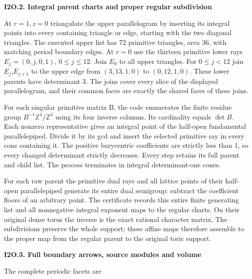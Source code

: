 \par

\medskip\noindent\textbf{I2O.2. Integral parent charts and proper regular subdivision}

\par\nobreak

At \(r=1,z=0\) triangulate the upper parallelogram by inserting its
integral points into every containing triangle or edge, starting
with the two diagonal triangles. The executed upper list has 72
primitive triangles, area 36, with matching period boundary edges.
At \(r=0\) use the thirteen primitive lower rays \(E_j=(0,j,0,1)\),
\(0\le j\le 12\). Join \(E_0\) to all upper triangles. For \(0\le j<12\) join
\(E_j\),\(E_{j+1}\) to the upper edge from \((3,13,1,0)\) to \((0,12,1,0)\).
These lower parents have determinant 3. The joins cover every
slice of the displayed parallelogram, and their common faces
are exactly the shared faces of these joins.

For each singular primitive matrix B, the code enumerates the
finite residue group \(B^{-1} \mathbb Z^4/\mathbb Z^4\) using its four inverse columns.
Its cardinality equals \(\operatorname{det} B\). Each nonzero representative gives
an integral point of the half-open fundamental parallelepiped.
Divide it by its gcd and insert the selected primitive ray in
every cone containing it. The positive barycentric coefficients
are strictly less than 1, so every changed determinant strictly
decreases. Every step retains its full parent and child list.
The process terminates in integral determinant-one cones.

For each raw parent the primitive dual rays and all lattice
points of their half-open parallelepiped generate its entire
dual semigroup: subtract the coefficient floors of an arbitrary
point. The certificate records this entire finite generating
list and all nonnegative integral exponent maps to the regular
charts. On their original dense torus the inverse is the exact
rational character matrix. The subdivisions preserve the whole
support; these affine maps therefore assemble to the proper
map from the regular parent to the original toric support.

\par

\medskip\noindent\textbf{I2O.3. Full boundary arrows, source modules and volume}

\par\nobreak

The complete periodic facets are

